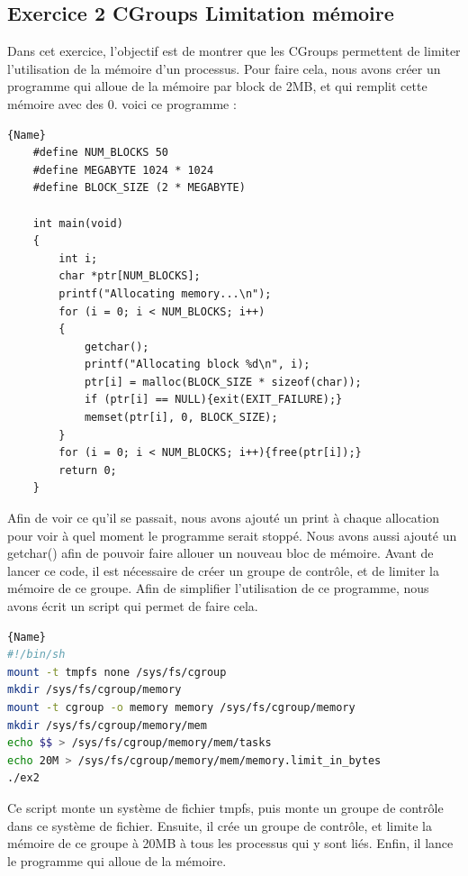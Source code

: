 \documentclass[
	a4paper, %
	10pt, %
]{CSUniSchoolLabReport}
\begin{document}
\subsection{Exercice 2 CGroups Limitation mémoire}\label{MPEx2}
Dans cet exercice, l'objectif est de montrer que les CGroups permettent de limiter l'utilisation de la m\'emoire d'un processus.
Pour faire cela, nous avons créer un programme qui alloue de la m\'emoire par block de 2MB, et qui remplit cette m\'emoire avec des 0.
voici ce programme : \\
\begin{lstlisting}[style=CStyle, caption=Allocation de memoire, firstnumber=1]{Name}
	#define NUM_BLOCKS 50
	#define MEGABYTE 1024 * 1024
	#define BLOCK_SIZE (2 * MEGABYTE)
	
	int main(void)
	{
		int i;
		char *ptr[NUM_BLOCKS];
		printf("Allocating memory...\n");
		for (i = 0; i < NUM_BLOCKS; i++)
		{
			getchar();
			printf("Allocating block %d\n", i);
			ptr[i] = malloc(BLOCK_SIZE * sizeof(char));
			if (ptr[i] == NULL){exit(EXIT_FAILURE);}
			memset(ptr[i], 0, BLOCK_SIZE);
		}
		for (i = 0; i < NUM_BLOCKS; i++){free(ptr[i]);}
		return 0;
	}
\end{lstlisting}
Afin de voir ce qu'il se passait, nous avons ajout\'e un print \`a chaque allocation pour voir \`a quel moment le programme serait stoppé.
Nous avons aussi ajout\'e un getchar() afin de pouvoir faire allouer un nouveau bloc de m\'emoire.
\linebreak
Avant de lancer ce code, il est n\'ecessaire de créer un groupe de contr\^ole, et de limiter la m\'emoire de ce groupe. Afin de simplifier l'utilisation de ce programme, nous avons écrit un script qui permet de faire cela.

\begin{lstlisting}[language=bash, firstnumber=1]{Name}
#!/bin/sh
mount -t tmpfs none /sys/fs/cgroup
mkdir /sys/fs/cgroup/memory
mount -t cgroup -o memory memory /sys/fs/cgroup/memory
mkdir /sys/fs/cgroup/memory/mem
echo $$ > /sys/fs/cgroup/memory/mem/tasks
echo 20M > /sys/fs/cgroup/memory/mem/memory.limit_in_bytes
./ex2
\end{lstlisting}
Ce script monte un syst\`eme de fichier tmpfs, puis monte un groupe de contr\^ole dans ce syst\`eme de fichier.
Ensuite, il cr\'ee un groupe de contr\^ole, et limite la m\'emoire de ce groupe à 20MB \`a tous les processus qui y sont liés.
Enfin, il lance le programme qui alloue de la m\'emoire.
\end{document}
